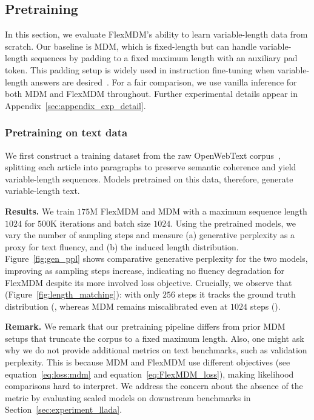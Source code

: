 \subsection{Pretraining} \label{sec:experiment_pretrain}
In this section, we evaluate FlexMDM’s ability to learn variable-length data from scratch. Our baseline is MDM, which is fixed-length but can handle variable-length sequences by padding to a fixed maximum length with an auxiliary pad token. This padding setup is widely used in instruction fine-tuning when variable-length answers are desired~\citep{nie2025large,nie2024scaling,dream2025,gong2024scaling}. For a fair comparison, we use vanilla inference for both MDM and FlexMDM throughout. Further experimental details appear in Appendix~\ref{sec:appendix_exp_detail}.


\subsubsection{Pretraining on text data}
We first construct a training dataset from the raw OpenWebText corpus~\citep{Gokaslan2019OpenWeb}, splitting each article into paragraphs to preserve semantic coherence and yield variable-length sequences. Models pretrained on this data, therefore, generate variable-length text.

\textbf{Results.} We train $175$M FlexMDM and MDM with a maximum sequence length $1024$ for $500$K iterations and batch size $1024$. Using the pretrained models, we vary the number of sampling steps and measure (a) generative perplexity as a proxy for text fluency, and (b) the induced length distribution. Figure~\ref{fig:gen_ppl} shows comparative generative perplexity for the two models, improving as sampling steps increase, indicating no fluency degradation for FlexMDM despite its more involved loss objective. Crucially, we observe that  (Figure~\ref{fig:length_matching}): with only $256$ steps it tracks the ground truth distribution (, whereas MDM remains miscalibrated even at $1024$ steps ().

\textbf{Remark.} We remark that our pretraining pipeline differs from prior MDM setups that truncate the corpus to a fixed maximum length. Also, one might ask why we do not provide additional metrics on text benchmarks, such as validation perplexity. This is because MDM and FlexMDM use different objectives (see equation~\eqref{eq:loss:mdm} and equation~\eqref{eq:FlexMDM_loss}), making likelihood comparisons hard to interpret. We address the concern about the absence of the metric by evaluating scaled models on downstream benchmarks in Section~\ref{sec:experiment_llada}.


